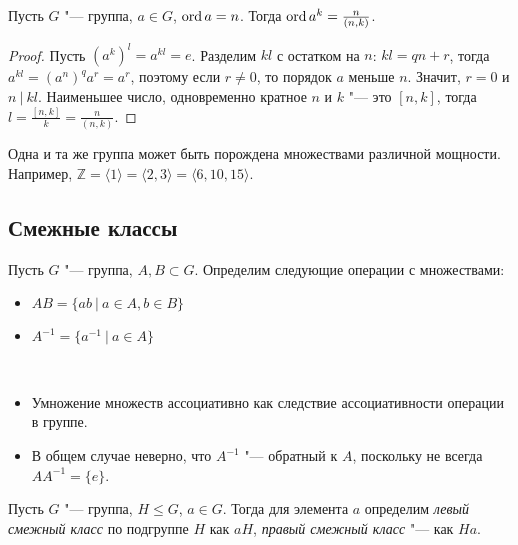\begin{proposition}
	Пусть $G$ "--- группа, $a \in G$, $\operatorname{ord}{a} = n$. Тогда $\operatorname{ord}{a^k} = \frac{n}{(n, k)}$.
\end{proposition}

\begin{proof}
	Пусть $(a^k)^l = a^{kl} = e$. Разделим $kl$ с остатком на $n$: $kl = qn + r$, тогда $a^{kl} = (a^{n})^qa^r = a^r$, поэтому если $r \ne 0$, то порядок $a$ меньше $n$. Значит, $r = 0$ и $n~|~kl$. Наименьшее число, одновременно кратное $n$ и $k$ "--- это $[n, k]$, тогда $l = \frac{[n, k]}{k} = \frac{n}{(n, k)}$.
\end{proof}

\begin{note}
	Одна и та же группа может быть порождена множествами различной мощности. Например, $\mathbb{Z} = \langle 1\rangle = \langle 2, 3\rangle = \langle 6, 10, 15\rangle$.
\end{note}

\subsection{Смежные классы}

\begin{definition}
	Пусть $G$ "--- группа, $A, B \subset G$. Определим следующие операции с множествами:
	\begin{itemize}
		\item $AB = \{ab~|~a \in A, b \in B\}$
		\item $A^{-1} = \{a^{-1}~|~a\in A\}$
	\end{itemize}
\end{definition}

\begin{note}~
	\begin{itemize}
		\item Умножение множеств ассоциативно как следствие ассоциативности операции в группе.
		\item В общем случае неверно, что $A^{-1}$ "--- обратный к $A$, поскольку не всегда $AA^{-1} = \{e\}$.
	\end{itemize}
\end{note}

\begin{definition}
	Пусть $G$ "--- группа, $H \le G$, $a \in G$. Тогда для элемента $a$ определим \textit{левый смежный класс} по подгруппе $H$ как $aH$, \textit{правый смежный класс} "--- как $Ha$.
\end{definition}

